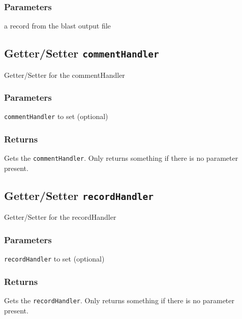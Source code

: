 \subsubsection*{Parameters\label{Parameters}}
\begin{description}

\item[{a record from the blast output file}] \mbox{}\end{description}
\subsection*{Getter/Setter \texttt{commentHandler}\label{Getter_Setter_commentHandler}}


Getter/Setter for the commentHandler

\subsubsection*{Parameters\label{Parameters}}
\begin{description}

\item[{\texttt{commentHandler} to set (optional)}] \mbox{}\end{description}
\subsubsection*{Returns\label{Returns}}


Gets the \texttt{commentHandler}. Only returns something if there is no parameter present.

\subsection*{Getter/Setter \texttt{recordHandler}\label{Getter_Setter_recordHandler}}


Getter/Setter for the recordHandler

\subsubsection*{Parameters\label{Parameters}}
\begin{description}

\item[{\texttt{recordHandler} to set (optional)}] \mbox{}\end{description}
\subsubsection*{Returns\label{Returns}}


Gets the \texttt{recordHandler}. Only returns something if there is no parameter present.
